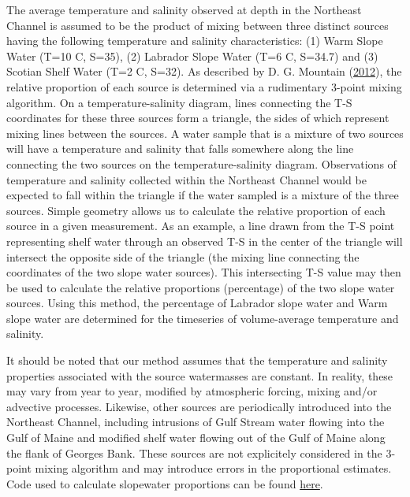 \documentclass[
]{book}
\begin{document}
The average temperature and salinity observed at depth in the Northeast Channel is assumed to be the product of mixing between three distinct sources having the following temperature and salinity characteristics: (1) Warm Slope Water (T=10 \textdegree C, S=35), (2) Labrador Slope Water (T=6 \textdegree C, S=34.7) and (3) Scotian Shelf Water (T=2 \textdegree C, S=32). As described by D. G. Mountain (\protect\hyperlink{ref-mountain2012}{2012}), the relative proportion of each source is determined via a rudimentary 3-point mixing algorithm. On a temperature-salinity diagram, lines connecting the T-S coordinates for these three sources form a triangle, the sides of which represent mixing lines between the sources. A water sample that is a mixture of two sources will have a temperature and salinity that falls somewhere along the line connecting the two sources on the temperature-salinity diagram. Observations of temperature and salinity collected within the Northeast Channel would be expected to fall within the triangle if the water sampled is a mixture of the three sources. Simple geometry allows us to calculate the relative proportion of each source in a given measurement. As an example, a line drawn from the T-S point representing shelf water through an observed T-S in the center of the triangle will intersect the opposite side of the triangle (the mixing line connecting the coordinates of the two slope water sources). This intersecting T-S value may then be used to calculate the relative proportions (percentage) of the two slope water sources. Using this method, the percentage of Labrador slope water and Warm slope water are determined for the timeseries of volume-average temperature and salinity.

It should be noted that our method assumes that the temperature and salinity properties associated with the source watermasses are constant. In reality, these may vary from year to year, modified by atmospheric forcing, mixing and/or advective processes. Likewise, other sources are periodically introduced into the Northeast Channel, including intrusions of Gulf Stream water flowing into the Gulf of Maine and modified shelf water flowing out of the Gulf of Maine along the flank of Georges Bank. These sources are not explicitely considered in the 3-point mixing algorithm and may introduce errors in the proportional estimates. Code used to calculate slopewater proportions can be found \href{https://github.com/NOAA-EDAB/tech-doc/blob/master/R/stored_scripts/slopewater_analysis.R}{here}.
\end{document}
